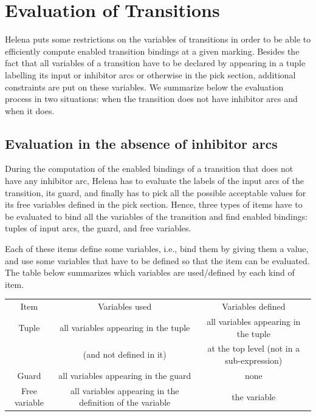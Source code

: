 \section{Evaluation of Transitions}
\label{sec:transition-evaluation}

Helena puts some restrictions on the variables of transitions in order
to be able to efficiently compute enabled transition bindings at a
given marking.  Besides the fact that all variables of a transition
have to be declared by appearing in a tuple labelling its input or
inhibitor arcs or otherwise in the pick section, additional
constraints are put on these variables.  We summarize below the
evaluation process in two situations: when the transition does not
have inhibitor arcs and when it does.

\subsection{Evaluation in the absence of inhibitor arcs}
During the computation of the enabled bindings of a transition that
does not have any inhibitor arc, Helena has to evaluate the labels of
the input arcs of the transition, its guard, and finally has to pick
all the possible acceptable values for its free variables defined in
the pick section.  Hence, three types of items have to be evaluated to
bind all the variables of the transition and find enabled bindings:
tuples of input arcs, the guard, and free variables.

Each of these items define some variables, i.e., bind them by giving
them a value, and use some variables that have to be defined so that
the item can be evaluated.  The table below summarizes which variables
are used/defined by each kind of item.

\begin{center}
\begin{tabular}{|c|c|c|}
\hline
Item & Variables used & Variables defined\\
\hhline{===}
Tuple
& all variables appearing in the tuple
& all variables appearing in the tuple\\
& (and not defined in it)
& at the top level (not in a sub-expression)\\
\hline
Guard & all variables appearing in the guard & none\\
\hline
Free variable
& all variables appearing in the definition of the variable
& the variable\\
\hline
\end{tabular}
\end{center}

